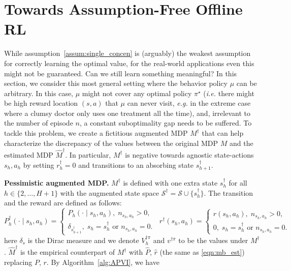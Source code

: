 \section{Towards Assumption-Free Offline RL}\label{sec:assumption_free}
While assumption~\ref{assum:single_concen} is (arguably) the weakest assumption for correctly learning the optimal value, for the real-world applications even this might not be guaranteed. Can we still learn something meaningful? In this section, we consider this most general setting where the behavior policy $\mu$ can be arbitrary. In this case, $\mu$ might not cover any optimal policy $\pi^\star$ (\emph{i.e.} there might be high reward location $(s,a)$ that $\mu$ can never visit, \emph{e.g.} in the extreme case where a clumsy doctor only uses one treatment all the time), and, irrelevant to the number of episode $n$, a constant suboptimality gap needs to be suffered. To tackle this problem, we create a fictitious augmented MDP $M^\dagger$ that can help characterize the discrepancy of the values between the original MDP ${M}$ and the estimated MDP $\widehat{M}^\dagger$. In particular, $M^\dagger$ is negative towards agnostic state-actions $s_h,a_h$ by setting $r^\dagger_h=0 $ and transitions to an absorbing state $s^\dagger_{h+1}$. 

\textbf{Pessimistic augmented MDP.} $M^\dagger$ is defined with one extra state $s_h^\dagger$ for all $h\in\{2,\ldots,H+1\}$ with the augmented state space $\mathcal{S}^\dagger=\mathcal{S}\cup\{s^\dagger_h\}$. The transition and the reward are defined as follows: 
{\small
	\[
	P^{\dagger}_h(\cdot \mid s_h, a_h)=\left\{\begin{array}{ll}
	P_h(\cdot \mid s_h, a_h), \;n_{s_h,a_h}>0, \\
	\delta_{s^{\dagger}_{h+1}}, \; s_h=s_h^{\dagger} \text { or } n_{s_h,a_h}=0.
	\end{array} \;\; r^{\dagger}( s_h, a_h)=\left\{\begin{array}{ll}
	r(s_h, a_h), \; n_{s_h,a_h}>0, \\
	0, \; s_h=s^{\dagger}_{h} \text { or } n_{s_h,a_h}=0.
	\end{array}\right.\right.
	\]}here $\delta_s$ is the Dirac measure and we denote $V^{\dagger \pi}_h$ and $v^{\dagger\pi}$ to be the values under $M^\dagger$. $\widehat{M}^\dagger$ is the empirical counterpart of $M^\dagger$ with $\widehat{P}$, $\widehat{r}$ (the same as \eqref{eqn:mb_est}) replacing $P$, $r$. By Algorithm~\ref{alg:APVI}, we have 


